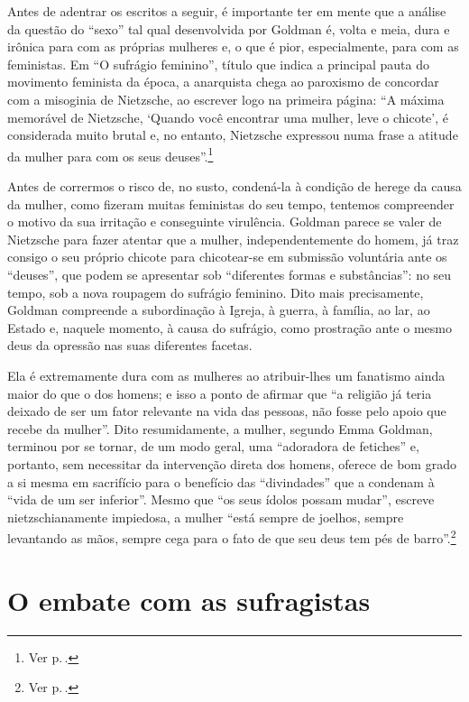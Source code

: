 Antes de adentrar os escritos a seguir, é importante ter em mente que a
análise da questão do ``sexo'' tal qual desenvolvida por Goldman é,
volta e meia, dura e irônica para com as próprias mulheres e, o que é
pior, especialmente, para com as feministas. Em ``O sufrágio feminino'',
título que indica a principal pauta do movimento feminista da época, a
anarquista chega ao paroxismo de concordar com a misoginia de Nietzsche,
ao escrever logo na primeira página: ``A máxima memorável de Nietzsche, `Quando você encontrar uma mulher, leve o chicote', é considerada muito brutal e, no entanto, Nietzsche
expressou numa frase a atitude da mulher para com os seus deuses''.\footnote{Ver p.\,\pageref{herege}.}

Antes de corrermos o risco de, no susto,
condená-la à condição de herege da causa da mulher, como
fizeram muitas feministas do seu tempo, tentemos
compreender o motivo da sua irritação e conseguinte virulência.
Goldman parece se valer de Nietzsche para fazer atentar que a mulher,
independentemente do homem, já traz consigo o seu próprio chicote para
chicotear-se em submissão voluntária ante os ``deuses'', que podem se
apresentar sob ``diferentes formas e substâncias'': no seu
tempo, sob a nova roupagem do sufrágio feminino. Dito mais precisamente,
Goldman compreende a subordinação à Igreja, à guerra, à família, ao lar,
ao Estado e, naquele momento, à causa do sufrágio, como prostração ante
o mesmo deus da opressão nas suas diferentes facetas.

Ela é extremamente
dura com as mulheres ao atribuir-lhes um fanatismo ainda maior do que o
dos homens; e isso a ponto de afirmar que ``a religião já teria deixado
de ser um fator relevante na vida das pessoas, não fosse pelo apoio que
recebe da mulher''. Dito resumidamente, a mulher, segundo Emma Goldman,
terminou por se tornar, de um modo geral, uma ``adoradora de fetiches''
e, portanto, sem necessitar da intervenção direta dos homens, oferece
de bom grado a si mesma em sacrifício para o benefício das
``divindades'' que a condenam à ``vida de um ser inferior''. Mesmo que
``os seus ídolos possam mudar'', escreve nietzschianamente impiedosa,
a mulher ``está sempre de joelhos, sempre levantando as mãos, sempre
cega para o fato de que seu deus tem pés de barro''.\footnote{Ver p.\,\pageref{barro}.}

\section{O embate com as sufragistas}

